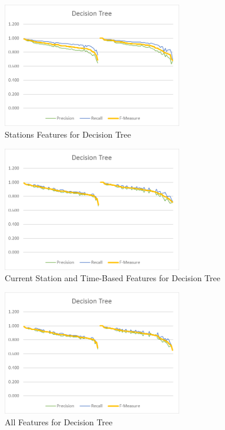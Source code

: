 \begin{figure}[H]
	\centering
	\includegraphics[width=0.7\textwidth]{files/high_vs_low_frequency/decision_tree_stas}
	\caption{Stations Features for Decision Tree}
\end{figure}

\begin{figure}[H]
	\centering
	\includegraphics[width=0.7\textwidth]{files/high_vs_low_frequency/decision_tree_csta_ts}
	\caption{Current Station and Time-Based Features for Decision Tree}
\end{figure}

\begin{figure}[H]
	\centering
	\includegraphics[width=0.7\textwidth]{files/high_vs_low_frequency/decision_tree_all}
	\caption{All Features for Decision Tree}
\end{figure}


